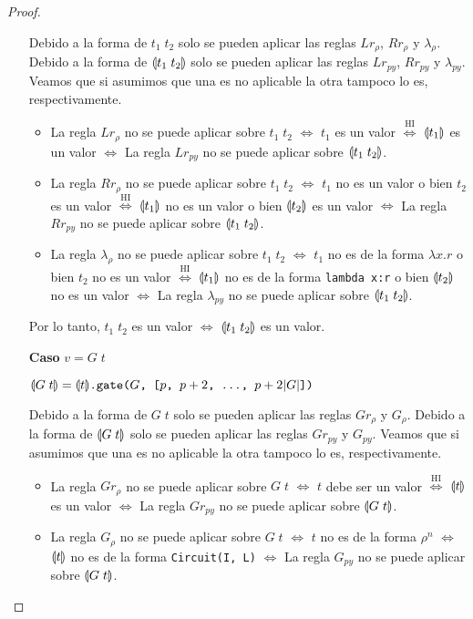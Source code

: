 \begin{proof}
\begin{itemize}
Debido a la forma de $t_1\;t_2$ solo se pueden aplicar las reglas $Lr_\rho$, $Rr_\rho$ y $\lambda_\rho$. Debido a la forma de  $\llparenthesis t_1\;t_2 \rrparenthesis$ solo se pueden aplicar las reglas $Lr_\textit{py}$, $Rr_\textit{py}$ y $\lambda_\textit{py}$. Veamos que si asumimos que una es no aplicable la otra tampoco lo es, respectivamente.
\begin{itemize}
    \item La regla $Lr_\rho$ no se puede aplicar sobre $t_1\;t_2$ $\Leftrightarrow$ $t_1$ es un valor $\stackrel{\textrm{HI}}{\Leftrightarrow}$ $\llparenthesis t_1 \rrparenthesis$ es un valor $\Leftrightarrow$ La regla $Lr_\textit{py}$ no se puede aplicar sobre $\llparenthesis t_1\;t_2 \rrparenthesis$.
    \item La regla $Rr_\rho$ no se puede aplicar sobre $t_1\;t_2$ $\Leftrightarrow$ $t_1$ no es un valor o bien $t_2$ es un valor $\stackrel{\textrm{HI}}{\Leftrightarrow}$ $\llparenthesis t_1 \rrparenthesis$ no es un valor o bien $\llparenthesis t_2 \rrparenthesis$ es un valor $\Leftrightarrow$ La regla $Rr_\textit{py}$ no se puede aplicar sobre $\llparenthesis t_1\;t_2 \rrparenthesis$.
    \item  La regla $\lambda_\rho$ no se puede aplicar sobre $t_1\;t_2$ $\Leftrightarrow$ $t_1$ no es de la forma $\lambda x.r$ o bien $t_2$ no es un valor $\stackrel{\textrm{HI}}{\Leftrightarrow}$ $\llparenthesis t_1 \rrparenthesis$ no es de la forma \texttt{lambda x:r} o bien $\llparenthesis t_2 \rrparenthesis$ no es un valor $\Leftrightarrow$ La regla $\lambda_\textit{py}$ no se puede aplicar sobre $\llparenthesis t_1\;t_2 \rrparenthesis$.
\end{itemize}

Por lo tanto, $t_1\;t_2$ es un valor $\Leftrightarrow$ $\llparenthesis t_1\;t_2 \rrparenthesis$ es un valor.
    
     \item[\textbf{Caso}] $v=G\;t$

$\llparenthesis G\;t \rrparenthesis =  \llparenthesis t \rrparenthesis\texttt{.gate(}G\texttt{, [}p\texttt{, }p+2\texttt{, \dots, }p+2|G|\texttt{])}$

Debido a la forma de $G\;t$ solo se pueden aplicar las reglas $Gr_\rho$ y $G_\rho$. Debido a la forma de  $\llparenthesis G\;t \rrparenthesis$ solo se pueden aplicar las reglas $Gr_\textit{py}$ y $G_\textit{py}$. Veamos que si asumimos que una es no aplicable la otra tampoco lo es, respectivamente.
\begin{itemize}
    \item La regla $Gr_\rho$ no se puede aplicar sobre $G\;t$ $\Leftrightarrow$ $t$ debe ser un valor $\stackrel{\textrm{HI}}{\Leftrightarrow}$ $\llparenthesis t \rrparenthesis$ es un valor $\Leftrightarrow$ La regla $Gr_\textit{py}$ no se puede aplicar sobre $\llparenthesis G\;t \rrparenthesis$.
    \item  La regla $G_\rho$ no se puede aplicar sobre $G\;t$ $\Leftrightarrow$ $t$ no es de la forma $\rho^n$ $\Leftrightarrow$ $\llparenthesis t \rrparenthesis$ no es de la forma \texttt{Circuit(I, L)} $\Leftrightarrow$ La regla $G_\textit{py}$ no se puede aplicar sobre $\llparenthesis G\;t \rrparenthesis$.
\end{itemize}


\end{itemize}
\end{proof}
